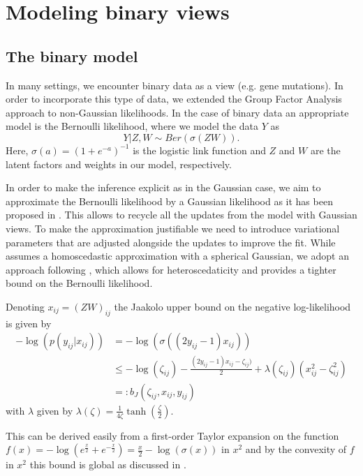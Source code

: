 \documentclass[10pt, a4paper,openany]{paper}
\begin{document}
\section{Modeling binary views}

\subsection{The binary model}
In many settings, we encounter binary data as a view (e.g. gene mutations).
In order to incorporate this type of data, we extended the Group Factor Analysis approach to non-Gaussian likelihoods.
In the case of binary data an appropriate model is the Bernoulli likelihood, where we model the data $Y$ as 
\begin{equation}
Y|Z,W \sim Ber(\sigma(ZW)).
\end{equation} Here, $\sigma(a)=(1+e^{-a})^{-1}$ is the logistic link function and $Z$ and $W$ are the latent factors and weights in our model, respectively.

In order to make the inference explicit as in the Gaussian case, we aim to approximate the Bernoulli likelihood by a Gaussian likelihood  as it has been proposed in \cite{Seeger}. This allows to recycle all the updates from the model with Gaussian views. To make the approximation justifiable we need to introduce variational parameters that are adjusted alongside the updates to improve the fit. While \cite[]{Seeger} assumes a homoscedastic approximation with a spherical Gaussian, we adopt an approach following \cite{Jaakkola}, which allows for heteroscedaticity and provides a tighter bound on the Bernoulli likelihood.

Denoting $x_{ij}=(ZW)_{ij}$ the Jaakolo upper bound \cite{Jaakkola} on the negative log-likelihood is given by
\begin{align}
	-\log\left(p(y_{ij}|x_{ij})\right) &= -\log\left(\sigma\left((2y_{ij}-1)  x_{ij}\right)\right)\\
	& \leq -\log(\zeta_{ij})-\frac{(2y_{ij}-1)x_{ij}-\zeta_{ij})}{2} +\lambda(\zeta_{ij})\left(x_{ij}^2 -\zeta_{ij}^2 \right)\\
	& =: b_J(\zeta_{ij}, x_{ij},y_{ij} )
	\label{jaakkola}
\end{align}
with $\lambda$ given by $\lambda(\zeta)=\frac{1}{4\zeta}\tanh\left(\frac{\zeta}{2}\right)$.

This can be derived easily from a first-order Taylor expansion on the function $f(x) = - \log(e^{\frac{x}{2}}+e^{-\frac{x}{2}}) = \frac{x}{2}-\log(\sigma(x))$ in $x^2$ and by the convexity of 
$f$ in $x^2$ this bound is global as discussed in \cite[]{Jaakkola}.
\end{document}
